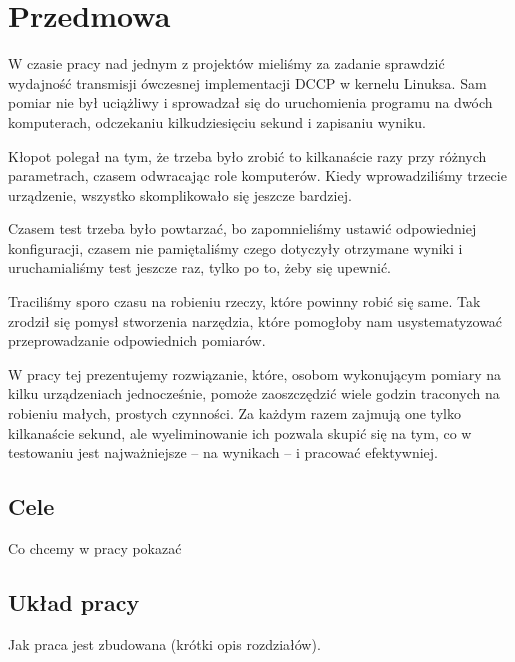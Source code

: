 \documentclass[00-praca-magisterska.tex]{subfiles}
\begin{document}
\chapter{Przedmowa}

W czasie pracy nad jednym z projektów mieliśmy za zadanie sprawdzić wydajność
transmisji ówczesnej implementacji DCCP w kernelu Linuksa. Sam pomiar nie był
uciążliwy i sprowadzał się do uruchomienia programu na dwóch komputerach,
odczekaniu kilkudziesięciu sekund i zapisaniu wyniku.

Kłopot polegał na tym, że trzeba było zrobić to kilkanaście razy przy różnych
parametrach, czasem odwracając role komputerów. Kiedy wprowadziliśmy trzecie
urządzenie, wszystko skomplikowało się jeszcze bardziej.

Czasem test trzeba było powtarzać, bo zapomnieliśmy ustawić odpowiedniej
konfiguracji, czasem nie pamiętaliśmy czego dotyczyły otrzymane wyniki i
uruchamialiśmy test jeszcze raz, tylko po to, żeby się upewnić.

Traciliśmy sporo czasu na robieniu rzeczy, które powinny robić się same. Tak
zrodził się pomysł stworzenia narzędzia, które pomogłoby nam usystematyzować
przeprowadzanie odpowiednich pomiarów.

W pracy tej prezentujemy rozwiązanie, które, osobom wykonującym pomiary na
kilku urządzeniach jednocześnie, pomoże zaoszczędzić wiele godzin traconych na
robieniu małych, prostych czynności. Za każdym razem zajmują one tylko
kilkanaście sekund, ale wyeliminowanie ich pozwala skupić się na tym, co w
testowaniu jest najważniejsze -- na wynikach -- i pracować efektywniej.

\newpage

\section{Cele}

Co chcemy w pracy pokazać

\section{Układ pracy}

Jak praca jest zbudowana (krótki opis rozdziałów).
\end{document}
